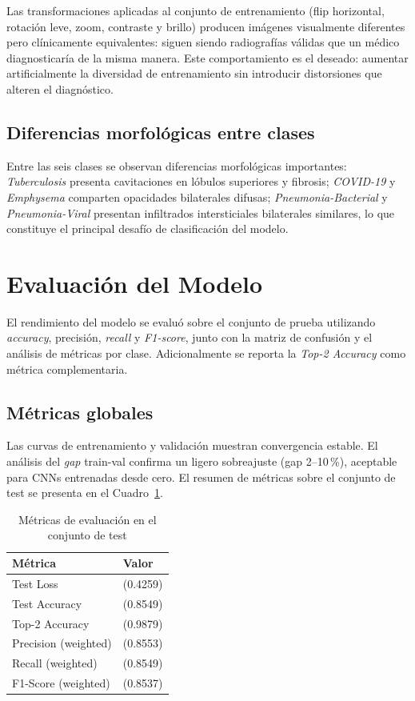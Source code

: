\documentclass[10pt,twocolumn]{article}
\begin{document}
Las transformaciones aplicadas al conjunto de entrenamiento
(flip horizontal, rotación leve, zoom, contraste y brillo) producen
imágenes visualmente diferentes pero clínicamente equivalentes: siguen
siendo radiografías válidas que un médico diagnosticaría de la misma
manera.  Este comportamiento es el deseado: aumentar artificialmente la
diversidad de entrenamiento sin introducir distorsiones que alteren el
diagnóstico.

\subsection{Diferencias morfológicas entre clases}

Entre las seis clases se observan diferencias morfológicas importantes:
\textit{Tuberculosis} presenta cavitaciones en lóbulos superiores y
fibrosis; \textit{COVID-19} y \textit{Emphysema} comparten opacidades
bilaterales difusas; \textit{Pneumonia-Bacterial} y
\textit{Pneumonia-Viral} presentan infiltrados intersticiales
bilaterales similares, lo que constituye el principal desafío de
clasificación del modelo.

\section{Evaluación del Modelo}

El rendimiento del modelo se evaluó sobre el conjunto de prueba
utilizando \textit{accuracy}, precisión, \textit{recall} y
\textit{F1-score}, junto con la matriz de confusión y el análisis de
métricas por clase.  Adicionalmente se reporta la \textit{Top-2
Accuracy} como métrica complementaria.

\subsection{Métricas globales}

Las curvas de entrenamiento y validación muestran convergencia estable.
El análisis del \textit{gap} train-val confirma un ligero sobreajuste
(gap 2--10\,\%), aceptable para CNNs entrenadas desde cero.  El resumen
de métricas sobre el conjunto de test se presenta en el
Cuadro~\ref{tab:metrics}.

\begin{table}[H]
  \caption{Métricas de evaluación en el conjunto de test}
  \label{tab:metrics}
  \centering\small
  \begin{tabular}{@{}ll@{}}
    \toprule
    \textbf{Métrica} & \textbf{Valor} \\
    \midrule
    Test Loss              & (0.4259) \\
    Test Accuracy          & (0.8549) \\
    Top-2 Accuracy         & (0.9879) \\
    Precision (weighted)   & (0.8553) \\
    Recall (weighted)      & (0.8549) \\
    F1-Score (weighted)    & (0.8537) \\
    \bottomrule
  \end{tabular}
\end{table}
\end{document}
